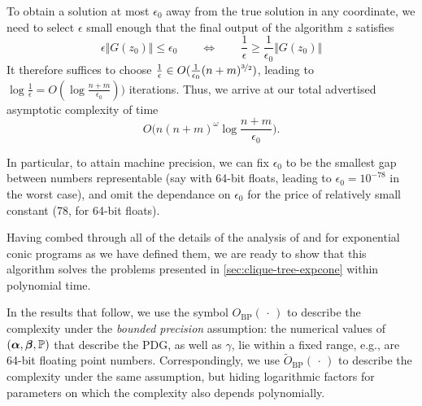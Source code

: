 \begin{subappendices}
\begin{lproof}
    To obtain a solution at most $\epsilon_0$ away from the true
    solution in any coordinate, we need to select $\epsilon$ small enough
    that the final output of the algorithm $z$ satisfies
    \[
        \epsilon \Vert G(z_0) \Vert  \le \epsilon_0
        \qquad\iff\qquad
        \frac1\epsilon \ge \frac1{\epsilon_0} \Vert G(z_0) \Vert
    \]
    It therefore suffices to choose
    $\frac{1}{\epsilon} \in O(\frac1{\epsilon_0} (n+m)^{\nicefrac32})$,
    leading to $\log \frac{1}{\epsilon} = O( \log \frac{n+m}{\epsilon_0} ) )$
    iterations.
%
    Thus, we arrive at our total advertised asymptotic complexity of time
    \[
        O \Big( n (n+m)^\omega \log \frac{n+m}{\epsilon_0} \Big).
    \]

    In particular, to attain machine precision, we can fix
    $\epsilon_0$ to be the smallest gap between numbers representable
    (say with 64-bit floats, leading to $\epsilon_0 = 10^{-78}$ in the worst case), and omit the dependance on $\epsilon_0$ for the price of relatively
    small constant (78, for 64-bit floats).
\end{lproof}

Having combed through all of the details of the analysis of  \textcite{badenbroek2021algorithm} and \textcite{nesterov1996infeasible} for exponential
conic programs as we have defined them, we are ready to show that this algorithm solves the problems presented in \cref{sec:clique-tree-expcone} within polynomial time.

In the results that follow, we use the symbol $O_{\text{BP}}( \, \cdot \,)$ to describe the complexity under the \emph{bounded precision} assumption:  the numerical values of $(\boldsymbol\alpha,\boldsymbol\beta, \mathbb P)$ that describe the PDG, as well as $\gamma$, lie within a fixed range, e.g., are 64-bit floating point numbers.
Correspondingly, we use $\tilde O_{\text{BP}}(\,\cdot\,)$ to describe the complexity
under the same assumption, but hiding logarithmic factors for parameters on which the complexity also depends polynomially.


\end{subappendices}

